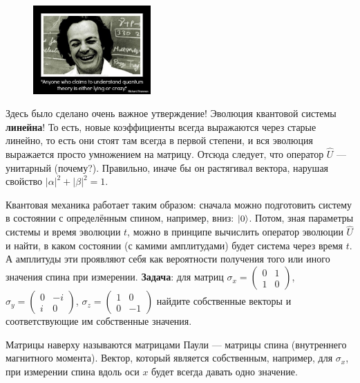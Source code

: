\documentclass[12pt]{article}
\begin{document}
\begin{figure}
  \begin{center}
    \includegraphics[width=0.40\textwidth]{quantumjoke3.jpg}
  \end{center}
\end{figure}
Здесь было сделано очень важное утверждение! Эволюция квантовой системы {\bf линейна}! То есть, новые коэффициенты всегда выражаются через старые линейно, то есть они стоят там всегда в первой степени, и вся эволюция выражается просто умножением на матрицу. Отсюда следует, что оператор $\hat{U}$ --- унитарный (почему?). Правильно, иначе бы он растягивал вектора, нарушая свойство $|\alpha|^2 + |\beta|^2 = 1$.

Квантовая механика работает таким образом: сначала можно подготовить систему в состоянии с определённым спином, например, вниз: $\Ket{0}$. Потом, зная параметры системы и время эволюции $t$, можно в принципе вычислить оператор эволюции $\hat{U}$ и найти, в каком состоянии (с камими амплитудами) будет система через время $t$. А амплитуды эти проявляют себя как вероятности получения того или иного значения спина при измерении.
{\bf Задача}: для матриц $\sigma_x = \begin{pmatrix} 0 & 1 \\ 1 & 0\end{pmatrix}$, $\sigma_y = \begin{pmatrix} 0 & -i \\ i & 0\end{pmatrix}$, $\sigma_z = \begin{pmatrix} 1 & 0 \\ 0 & -1\end{pmatrix}$ найдите собственные векторы и соответствующие им собственные значения.

Матрицы наверху называются матрицами Паули --- матрицы спина (внутреннего магнитного момента). Вектор, который является собственным, например, для $\sigma_x$, при измерении спина вдоль оси $x$ будет всегда давать одно значение.
\end{document}
